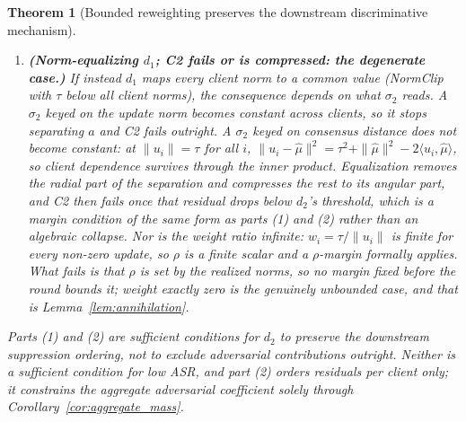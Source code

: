 \documentclass{article}
\newtheorem{theorem}{Theorem}
\begin{document}
\begin{theorem}[Bounded reweighting preserves the downstream discriminative mechanism]
\begin{enumerate}[noitemsep,topsep=2pt]
\[\]
under which every adversarial residual $\|u'_a - \mu'\|$ strictly exceeds every benign residual $\|u'_b - \mu'\|$, so RFA's inverse-residual weight on $a$ stays below the benign floor.
\item \textbf{(Norm-equalizing $d_1$; C2 fails or is compressed: the degenerate case.)} If instead $d_1$ maps every client norm to a common value (NormClip with $\tau$ below all client norms), the consequence depends on what $\sigma_2$ reads. A $\sigma_2$ keyed on the update norm becomes constant across clients, so it stops separating $a$ and C2 fails outright. A $\sigma_2$ keyed on consensus distance does \emph{not} become constant: at $\|u_i\|{=}\tau$ for all $i$, $\|u_i-\hat\mu\|^2 = \tau^2 + \|\hat\mu\|^2 - 2\langle u_i,\hat\mu\rangle$, so client dependence survives through the inner product. Equalization removes the \emph{radial} part of the separation and compresses the rest to its angular part, and C2 then fails once that residual drops below $d_2$'s threshold, which is a margin condition of the same form as parts (1) and (2) rather than an algebraic collapse. Nor is the weight ratio infinite: $w_i = \tau/\|u_i\|$ is finite for every non-zero update, so $\rho$ is a finite scalar and a $\rho$-margin formally applies. What fails is that $\rho$ is set by the realized norms, so no margin fixed \emph{before} the round bounds it; weight exactly zero is the genuinely unbounded case, and that is Lemma~\ref{lem:annihilation}.
\end{enumerate}
Parts (1) and (2) are sufficient conditions for $d_2$ to \emph{preserve the downstream suppression ordering}, not to exclude adversarial contributions outright. Neither is a sufficient condition for low ASR, and part (2) orders residuals per client only; it constrains the \emph{aggregate} adversarial coefficient solely through Corollary~\ref{cor:aggregate_mass}.
\end{theorem}
\end{document}
